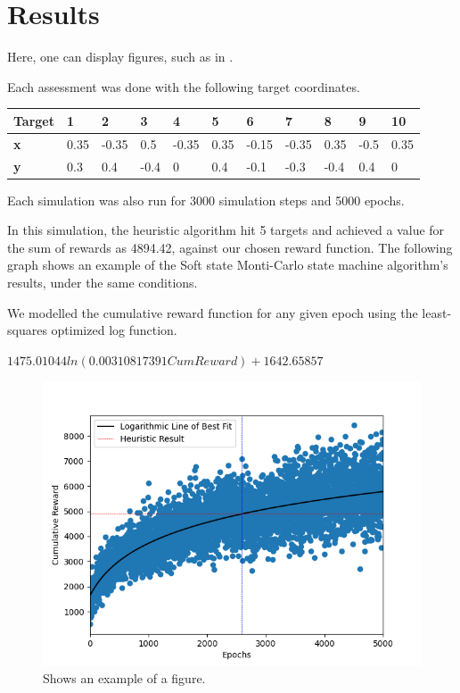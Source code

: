 \section{Results}

Here, one can display figures, such as in .

Each assessment was done with the following target coordinates.

\begin{table}[]
    \begin{tabular}{|l|l|l|l|l|l|l|l|l|l|l|}
    \hline
    \textbf{Target} & \textbf{1} & \textbf{2} & \textbf{3} & \textbf{4} & \textbf{5} & \textbf{6} & \textbf{7} & \textbf{8} & \textbf{9} & \textbf{10} \\ \hline
    \textbf{x}      & 0.35       & -0.35      & 0.5        & -0.35      & 0.35       & -0.15      & -0.35      & 0.35       & -0.5       & 0.35        \\ \hline
    \textbf{y}      & 0.3        & 0.4        & -0.4       & 0          & 0.4        & -0.1       & -0.3       & -0.4       & 0.4        & 0           \\ \hline
    \end{tabular}
\end{table}

Each simulation was also run for 3000 simulation steps and 5000 epochs.

In this simulation, the heuristic algorithm hit 5 targets and achieved a value for the sum of rewards as 4894.42, against our chosen reward function.
The following graph shows an example of the Soft state Monti-Carlo state machine algorithm’s results, under the same conditions.

We modelled the cumulative reward function for any given epoch using the least-squares optimized log function.

\begingroup\centering
$1475.01044ln(0.00310817391CumReward) + 1642.65857$
\endgroup



\begin{figure}
    \centering
    \includegraphics[width=\singlefigure]{figures/figure_2.png}
    \caption{\label{fig:example} Shows an example of a figure.}
\end{figure}

